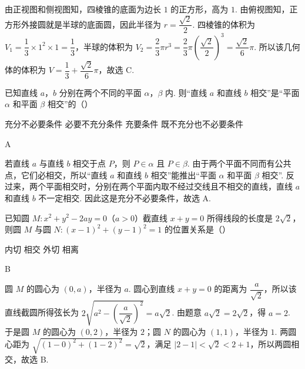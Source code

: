 \begin{solution}
由正视图和侧视图知，四棱锥的底面为边长 \(1\) 的正方形，高为 \(1\). 由俯视图知，正方形外接圆就是半球的底面圆，因此半径为 \(r=\dfrac{\sqrt2}{2}\). 四棱锥的体积为 \(V_1=\dfrac13\times1^2\times1=\dfrac13\)，半球的体积为 \(V_2=\dfrac23\pi r^3=\dfrac23\pi\left(\dfrac{\sqrt2}{2}\right)^3=\dfrac{\sqrt2}{6}\pi\). 所以该几何体的体积为 \(V=\dfrac13+\dfrac{\sqrt2}{6}\pi\)，故选 C.
\end{solution}

\begin{problem}
已知直线 \(a\)，\(b\) 分别在两个不同的平面 \(\alpha\)，\(\beta\) 内. 则“直线 \(a\) 和直线 \(b\) 相交”是“平面 \(\alpha\) 和平面 \(\beta\) 相交”的（\quad）

\choices
    {充分不必要条件}
    {必要不充分条件}
    {充要条件}
    {既不充分也不必要条件}
\end{problem}

\begin{answer}
A
\end{answer}

\begin{solution}
若直线 \(a\) 与直线 \(b\) 相交于点 \(P\)，则 \(P\in\alpha\) 且 \(P\in\beta\). 由于两个平面不同而有公共点，它们必相交，所以“直线 \(a\) 和直线 \(b\) 相交”能推出“平面 \(\alpha\) 和平面 \(\beta\) 相交”. 反过来，两个平面相交时，分别在两个平面内取不经过交线且不相交的直线，直线 \(a\) 和直线 \(b\) 不一定相交. 因此这是充分不必要条件，故选 A.
\end{solution}

\begin{problem}
已知圆 \(M:x^2+y^2-2ay=0\)（\(a>0\)）截直线 \(x+y=0\) 所得线段的长度是 \(2\sqrt2\)，则圆 \(M\) 与圆 \(N:(x-1)^2+(y-1)^2=1\) 的位置关系是（\quad）

\choices
    {内切}
    {相交}
    {外切}
    {相离}
\end{problem}

\begin{answer}
B
\end{answer}

\begin{solution}
圆 \(M\) 的圆心为 \((0,a)\)，半径为 \(a\). 圆心到直线 \(x+y=0\) 的距离为 \(\dfrac{a}{\sqrt2}\)，所以该直线截圆所得弦长为 \(2\sqrt{a^2-\left(\dfrac{a}{\sqrt2}\right)^2}=a\sqrt2\). 由题意 \(a\sqrt2=2\sqrt2\)，得 \(a=2\). 于是圆 \(M\) 的圆心为 \((0,2)\)，半径为 \(2\)；圆 \(N\) 的圆心为 \((1,1)\)，半径为 \(1\). 两圆心距为 \(\sqrt{(1-0)^2+(1-2)^2}=\sqrt2\)，满足 \(\left|2-1\right|<\sqrt2<2+1\)，所以两圆相交，故选 B.
\end{solution}

